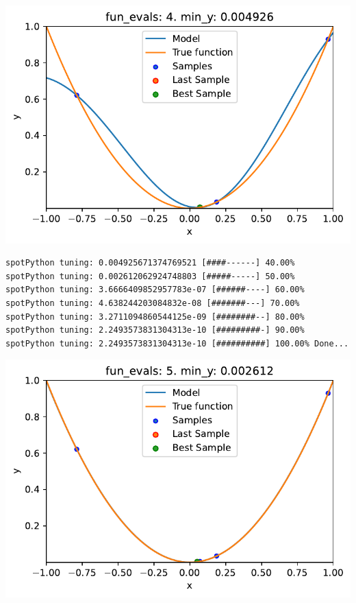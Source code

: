 \documentclass[
  letterpaper,
  DIV=11,
  numbers=noendperiod]{scrreprt}
\begin{document}
\includegraphics{010_num_spot_sklearn_surrogate_files/figure-pdf/cell-24-output-2.pdf}

\begin{verbatim}
spotPython tuning: 0.004925671374769521 [####------] 40.00% 
spotPython tuning: 0.002612062924748803 [#####-----] 50.00% 
spotPython tuning: 3.6666409852957783e-07 [######----] 60.00% 
spotPython tuning: 4.638244203084832e-08 [#######---] 70.00% 
spotPython tuning: 3.2711094860544125e-09 [########--] 80.00% 
spotPython tuning: 2.2493573831304313e-10 [#########-] 90.00% 
spotPython tuning: 2.2493573831304313e-10 [##########] 100.00% Done...
\end{verbatim}

\includegraphics{010_num_spot_sklearn_surrogate_files/figure-pdf/cell-24-output-4.pdf}
\end{document}
